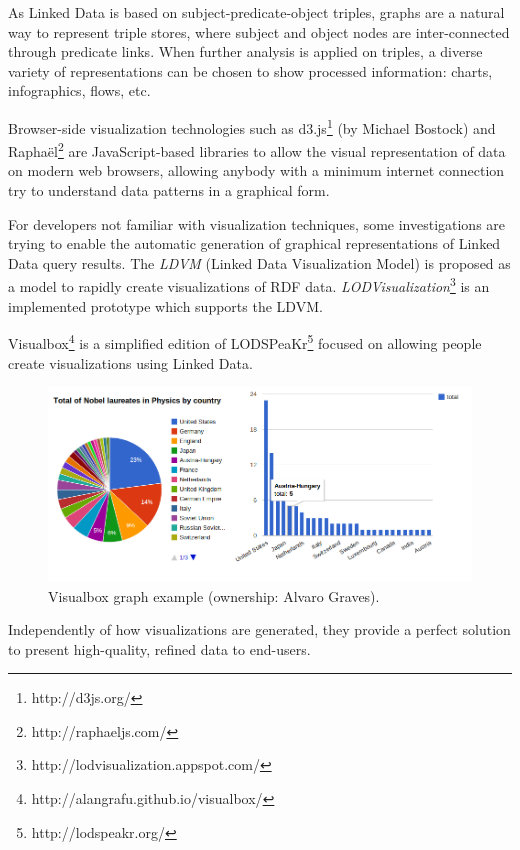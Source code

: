 As Linked Data is based on subject-predicate-object triples, graphs are a natural way to represent triple stores, where subject and object nodes are inter-connected through predicate links. When further analysis is applied on triples, a diverse variety of representations can be chosen to show processed information: charts, infographics, flows, etc.\cite{khan2011data}

Browser-side visualization technologies such as d3.js\footnote{http://d3js.org/} (by Michael Bostock) and Raphaël\footnote{http://raphaeljs.com/} are JavaScript-based libraries to allow the visual representation of data on modern web browsers, allowing anybody with a minimum internet connection try to understand data patterns in a graphical form.

For developers not familiar with visualization techniques, some investigations are trying to enable the automatic generation of graphical representations of Linked Data query results. The \textit{LDVM} (Linked Data Visualization Model) \cite{brunetti2012linked} is proposed as a model to rapidly create visualizations of RDF data. \textit{LODVisualization}\footnote{http://lodvisualization.appspot.com/} is an implemented prototype which supports the LDVM.

Visualbox\footnote{http://alangrafu.github.io/visualbox/} is a simplified edition of LODSPeaKr\footnote{http://lodspeakr.org/} focused on allowing people create visualizations using Linked Data.

\begin{figure}
    \center
    \includegraphics[width=\textwidth]{img/ld_approach/graph.png}
    \caption{Visualbox graph example (ownership: Alvaro Graves).}
\end{figure}

Independently of how visualizations are generated, they provide a perfect solution to present high-quality, refined data to end-users.

